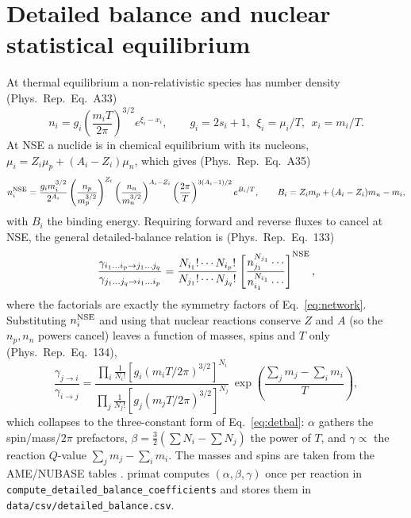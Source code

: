 \documentclass[11pt,a4paper]{article}
\newcommand{\code}[1]{\texttt{#1}}
\newcommand{\PR}{Phys.\ Rep.}
\begin{document}
\section{Detailed balance and nuclear statistical equilibrium}\label{app:nse}
At thermal equilibrium a non-relativistic species has number density (\PR\
Eq.~A33)
\begin{equation}
  n_i = g_i\left(\frac{m_iT}{2\pi}\right)^{3/2}e^{\xi_i-x_i},
  \qquad g_i=2s_i+1,\ \ \xi_i=\mu_i/T,\ \ x_i=m_i/T .
\end{equation}
At NSE a nuclide is in chemical equilibrium with its nucleons,
$\mu_i=Z_i\mu_p+(A_i-Z_i)\mu_n$, which gives (\PR\ Eq.~A35)
\begin{equation}
  n_i^{\rm NSE} = \frac{g_i m_i^{3/2}}{2^{A_i}}
    \left(\frac{n_p}{m_p^{3/2}}\right)^{Z_i}
    \left(\frac{n_n}{m_n^{3/2}}\right)^{A_i-Z_i}
    \left(\frac{2\pi}{T}\right)^{3(A_i-1)/2} e^{B_i/T},
  \qquad B_i = Z_im_p+(A_i-Z_i)m_n-m_i,
\end{equation}
with $B_i$ the binding energy. Requiring forward and reverse fluxes to cancel at
NSE, the general detailed-balance relation is (\PR\ Eq.~133)
\begin{equation}
  \frac{\gamma_{i_1\dots i_p\to j_1\dots j_q}}{\gamma_{j_1\dots j_q\to i_1\dots i_p}}
   = \frac{N_{i_1}!\cdots N_{i_p}!}{N_{j_1}!\cdots N_{j_q}!}
     \left[\frac{n_{j_1}^{N_{j_1}}\cdots}{n_{i_1}^{N_{i_1}}\cdots}\right]^{\rm NSE},
\end{equation}
where the factorials are exactly the symmetry factors of
Eq.~\eqref{eq:network}. Substituting $n_i^{\rm NSE}$ and using that nuclear
reactions conserve $Z$ and $A$ (so the $n_p,n_n$ powers cancel) leaves a function
of masses, spins and $T$ only (\PR\ Eq.~134),
\begin{equation}
  \frac{\gamma_{j\to i}}{\gamma_{i\to j}}
   = \frac{\prod_i \tfrac{1}{N_i!}\left[g_i(m_iT/2\pi)^{3/2}\right]^{N_i}}
          {\prod_j \tfrac{1}{N_j!}\left[g_j(m_jT/2\pi)^{3/2}\right]^{N_j}}\,
     \exp\!\left(\frac{\sum_j m_j-\sum_i m_i}{T}\right),
\end{equation}
which collapses to the three-constant form of Eq.~\eqref{eq:detbal}: $\alpha$
gathers the spin/mass/$2\pi$ prefactors, $\beta=\tfrac{3}{2}(\sum N_i-\sum N_j)$
the power of $T$, and $\gamma\propto$ the reaction $Q$-value $\sum_j m_j-\sum_i
m_i$. The masses and spins are taken from the AME/NUBASE tables
\cite{AME2016}. primat computes $(\alpha,\beta,\gamma)$ once per reaction in
\code{compute\_detailed\_balance\_coefficients} and stores them in
\code{data/csv/detailed\_balance.csv}.
\end{document}

